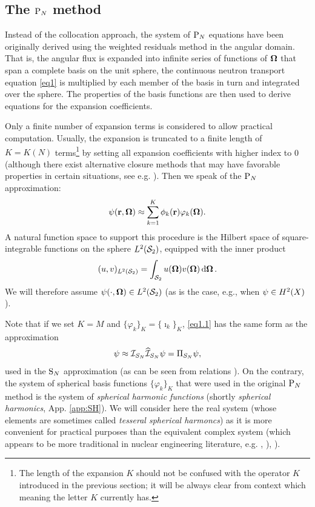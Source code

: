 \subsection{The $\PN$ method}\label{sec:PN}

Instead of the collocation approach, the system of $\PN$ equations have been originally derived using the weighted
residuals method in the angular domain. That is, the angular flux is expanded into infinite series of functions of
$\bomega$ that span a complete basis on the unit sphere, the continuous neutron transport equation \eqref{eq1} is multiplied by each member of
the basis in turn and integrated over the sphere. The properties of the basis functions are then used to derive
equations for the expansion coefficients. 

Only a finite number of expansion terms is considered to allow practical computation.
Usually, the expansion is truncated to a finite length of $K = K(N)$ terms\footnote{The length of the expansion $K$
should not be confused with the operator $K$ introduced in the previous section; it will be always clear from context 
which meaning the letter $K$ currently has.} by setting all expansion coefficients with higher index to 0 (although there exist alternative closure methods that may have favorable properties in certain situations, see e.g.
\cite{Frank0}). Then we speak of the $\PN$ approximation:
\begin{equation}\label{eq1.1}
  \psi(\br,\bomega) \approx \sum_{k=1}^{ K} \phi_k(\br) \varphi_k(\bomega).
\end{equation}
A natural function space to support this procedure is the Hilbert space of
square-integrable functions on the sphere $\Lp[2](\Sphere)$, equipped with the inner product
\begin{equation}\label{eq:s2_ip}
	(u, v)_{\Lp[2](\Sphere)} = \intA{u(\bomega) {v(\bomega)}}.
\end{equation}
We will therefore assume \mbox{$\psi(\cdot,\bomega)\in\Lp[2](\Sphere)$} (as is the case, e.g., when 
$\psi\in\Hp[2](X)$).

Note that if we set $K = M$ and $\{\varphi_k\}_K = \{\imath_k\}_K$, \eqref{eq1.1} has the same form as the approximation 
$$
	\psi \approx \PiSN\PihSN\psi = \Projop[S_N]{\psi},
$$
used in the $\SN$ approximation (as can be seen from relations ). On the
contrary, the system of spherical basis functions $\{\varphi_k\}_K$ that were used in the original $\PN$ method is the
system of \textit{spherical harmonic functions} (shortly \textit{spherical harmonics}, App. \ref{app:SH}).
We will consider here the real system (whose elements are sometimes called \textit{tesseral spherical harmoncs}) as it is more convenient
for practical purposes than the equivalent complex system (which appears to be more traditional in nuclear engineering 
literature, e.g. \cite[Sec. 9.7]{Stacey1}, \cite[Sec. 14.4]{Reuss1}), \cite[Chap. V]{Stammler}). 

